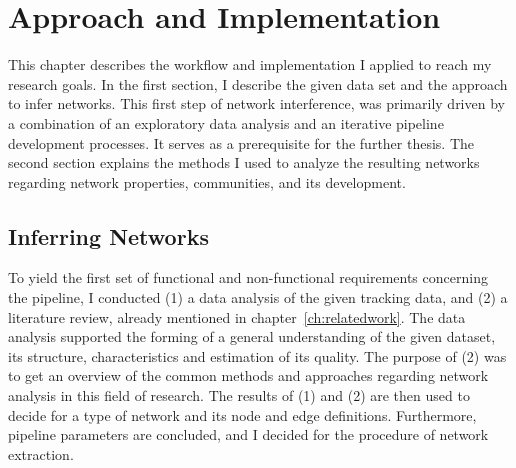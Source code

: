 \chapter{Approach and Implementation}
\label{ch:approach}

This chapter describes the workflow and implementation I applied to reach my research goals. 
In the first section, I describe the given data set and the approach to infer networks.
This first step of network interference, was primarily driven by a combination of an exploratory data analysis and an iterative pipeline development processes.
It serves as a prerequisite for the further thesis.
The second section explains the methods I used to analyze the resulting networks regarding network properties, communities, and its development.

\section{Inferring Networks}
\label{sec:infNetworks}
To yield the first set of functional and non-functional requirements concerning the pipeline, I conducted (1) a data analysis of the given tracking data, and (2) a literature review,  already mentioned in chapter~\ref{ch:relatedwork}.
The data analysis supported the forming of a general understanding of the given dataset, its structure, characteristics and estimation of its quality.
The purpose of (2) was to get an overview of the common methods and approaches regarding network analysis in this field of research.
The results of (1) and (2) are then used to decide for a type of network and its node and edge definitions.
Furthermore, pipeline parameters are concluded, and I decided for the procedure of network extraction.


